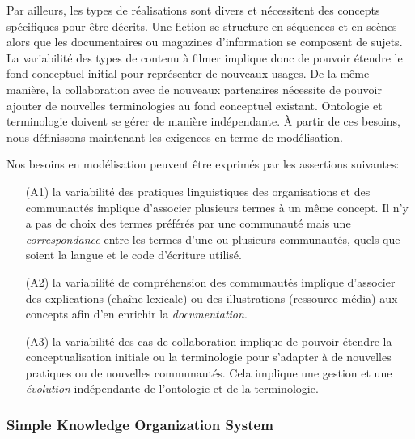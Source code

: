 Par ailleurs, les types de réalisations sont divers et nécessitent des concepts spécifiques pour être décrits. Une fiction se structure en séquences et en scènes alors que les documentaires ou magazines d'information se composent de sujets. 
La variabilité des types de contenu à filmer implique donc de pouvoir étendre le fond conceptuel initial pour représenter de nouveaux usages. 
De la même manière, la collaboration avec de nouveaux partenaires nécessite de pouvoir ajouter de nouvelles terminologies au fond conceptuel existant. 
Ontologie et terminologie doivent se gérer de manière indépendante. 
À partir de ces besoins, nous définissons maintenant les exigences en terme de modélisation. 

Nos besoins en modélisation peuvent être exprimés par les assertions suivantes:
\begin{enumerate}
	\item[(A1)] la variabilité des pratiques linguistiques des organisations et des communautés implique d'associer plusieurs termes à un même concept. Il n'y a pas de choix des termes préférés par une communauté mais une \textit{correspondance} entre les termes d'une ou plusieurs communautés, quels que soient la langue et le code d'écriture utilisé.
	
	\item[(A2)] la variabilité de compréhension des communautés implique d'associer des explications (chaîne lexicale) ou des illustrations (ressource média) aux concepts afin d'en enrichir la \textit{documentation}. 
	
	\item[(A3)] la variabilité des cas de collaboration implique de pouvoir étendre la conceptualisation initiale ou la terminologie pour s'adapter à de nouvelles pratiques ou de nouvelles communautés. Cela implique une gestion et une \textit{évolution} indépendante de l'ontologie et de la terminologie. 
\end{enumerate}



\subsubsection*{Simple Knowledge Organization System}

